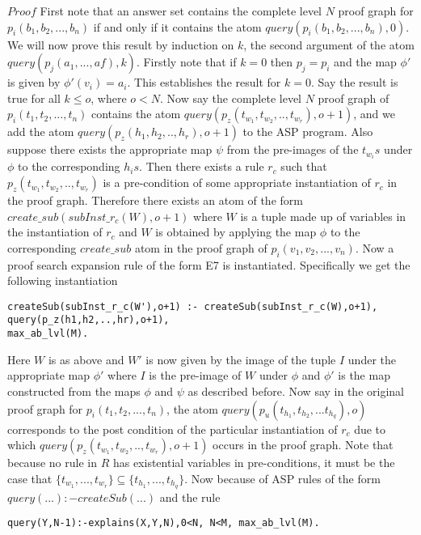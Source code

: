 \documentclass[sigconf]{acmart}
\begin{document}
$\textit{Proof}$ First note that an answer set contains the complete level $N$ proof graph for $p_{i}(b_{1},b_{2},...,b_{n})$ if and only if it contains the atom $query(p_{i}(b_{1},b_{2},...,b_{n}),0)$. We will now prove this result by induction on $k$, the second argument of the atom $query(p_{j}(a_{1},...,a{f}),k)$. Firstly note that if $k = 0$ then $p_{j} = p_{i}$ and the map $\phi'$ is given by $\phi'(v_{i}) = a_{i}$. This establishes the result for $k=0$.  Say the result is true for all $k\leq o$, where $o<N$. Now say the complete level $N$ proof graph of $p_{i}(t_{1},t_{2},...,t_{n})$ contains the atom $query(p_{z}(t_{w_{1}},t_{w_{2}},..,t_{w_{r}}),o+1)$, and we add the atom $query(p_{z}(h_{1},h_{2},..,h_{r}),o+1)$ to the ASP program. Also suppose there exists the appropriate map $\psi$ from the pre-images of the $t_{w_{i}}s$ under $\phi$ to the corresponding $h_{i}s$. Then there exists a rule $r_{c}$ such that $p_{z}(t_{w_{1}},t_{w_{2}},..,t_{w_{r}})$ is a pre-condition of some appropriate instantiation of $r_{c}$ in the proof graph. Therefore there exists an atom of the form $create\_sub(subInst\_r_{c}(W),o+1)$ where $W$ is a tuple made up of variables in the instantiation of $r_{c}$ and $W$ is obtained by applying the map $\phi$ to the corresponding $create\_sub$ atom in the proof graph of $p_{i}(v_{1},v_{2},...,v_{n})$. Now a proof search expansion rule of the form E7 is instantiated. Specifically we get the following instantiation 
\begin{verbatim}
createSub(subInst_r_c(W'),o+1) :- createSub(subInst_r_c(W),o+1), query(p_z(h1,h2,..,hr),o+1),
max_ab_lvl(M).
\end{verbatim}

Here $W$ is as above and $W'$ is now given by the image of the tuple $I$ under
the appropriate map $\phi'$ where $I$ is the pre-image of $W$ under $\phi$ and
$\phi'$ is the map constructed from the maps $\phi$ and $\psi$ as described
before. Now say in the original proof graph for
$p_{i}(t_{1},t_{2},...,t_{n})$, the atom
$query(p_{u}(t_{h_{1}},t_{h_{2}},...t_{h_{q}}),o)$ corresponds to the post
condition of the particular instantiation of $r_{c}$ due to which
$query(p_{z}(t_{w_{1}},t_{w_{2}},..,t_{w_{r}}),o+1)$ occurs in the proof
graph. Note that because no rule in $R$ has existential variables in
pre-conditions, it must be the case that
$\{t_{w_{1}},...,t_{w_{r}}\}\subseteq\{t_{h_{1}},...,t_{h_{q}}\}$. Now because
of ASP rules of the form $query(...):-createSub(...)$ and the rule
\begin{verbatim}
query(Y,N-1):-explains(X,Y,N),0<N, N<M, max_ab_lvl(M).    
\end{verbatim}
\end{document}
